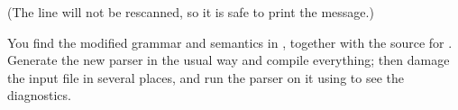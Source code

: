 (The line will not be rescanned, so it is safe to print the message.)

You find the modified grammar and semantics in ,
together with the source for .
Generate the new parser in the usual way and compile everything;
then damage the input file in several places,
and run the parser on it using 
to see the diagnostics.
